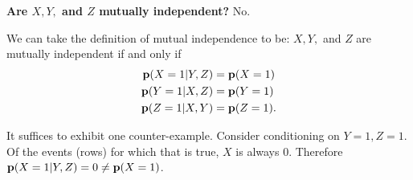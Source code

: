 \begin{enumerate}[label=(\alph*)]
    \begin{mdframed}
      \textbf{Are $X, Y,$ and $Z$ mutually independent?} No.

      We can take the definition of mutual independence to be: $X, Y,$ and $Z$
      are mutually independent if and only if
      \begin{align*}
        \mathbf{p}(X=1|Y,Z) &= \mathbf{p}(X=1)\\
        \mathbf{p}(Y=1|X,Z) &= \mathbf{p}(Y=1)\\
        \mathbf{p}(Z=1|X,Y) &= \mathbf{p}(Z=1).
      \end{align*}

      It suffices to exhibit one counter-example. Consider conditioning on
      $Y=1,Z=1$. Of the events (rows) for which that is true, $X$ is always
      0. Therefore $\mathbf{p}(X=1|Y,Z) = 0 \neq \mathbf{p}(X=1)$.

    \end{mdframed}

\end{enumerate}

\newpage

